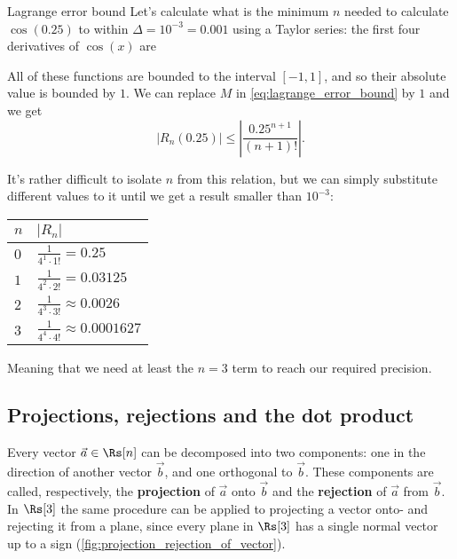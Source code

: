 \begin{example}{Lagrange error bound}{}
	Let's calculate what is the minimum $n$ needed to calculate $\cos(0.25)$ to within $\Delta=10^{-3}=0.001$ using a Taylor series: the first four derivatives of $\cos(x)$ are 

	\begin{center}
	\end{center}

	All of these functions are bounded to the interval $[-1,1]$, and so their absolute value is bounded by $1$. We can replace $M$ in \autoref{eq:lagrange_error_bound} by $1$ and we get
	\[
		\left| R_{n}(0.25) \right| \leq \left| \frac{0.25^{n+1}}{(n+1)!} \right|.
	\]

	It's rather difficult to isolate $n$ from this relation, but we can simply substitute different values to it until we get a result smaller than $10^{-3}$:

	\begin{center}
		\begin{tabular}{l|l}
			\toprule
			$n$ & $\left| R_{n} \right| $ \\ 
			\midrule
			$0$ & $\frac{1}{4^{1}\cdot1!} = 0.25$ \\
			$1$ & $\frac{1}{4^{2}\cdot2!} = 0.03125$ \\
			$2$ & $\frac{1}{4^{3}\cdot3!} \approx 0.0026$ \\
			$3$ & $\frac{1}{4^{4}\cdot4!} \approx 0.0001627$ \\
			\bottomrule
		\end{tabular}
	\end{center}

	\vspace{1em}
	Meaning that we need at least the $n=3$ term to reach our required precision.
\end{example}

\subsection{Projections, rejections and the dot product}
Every vector $\vec{a}\in\Rs[n]$ can be decomposed into two components: one in the direction of another vector $\vec{b}$, and one orthogonal to $\vec{b}$. These components are called, respectively, the \textbf{projection} of $\vec{a}$ onto $\vec{b}$ and the \textbf{rejection} of $\vec{a}$ from $\vec{b}$. In $\Rs[3]$ the same procedure can be applied to projecting a vector onto- and rejecting it from a plane, since every plane in $\Rs[3]$ has a single normal vector up to a sign (\autoref{fig:projection_rejection_of_vector}).

